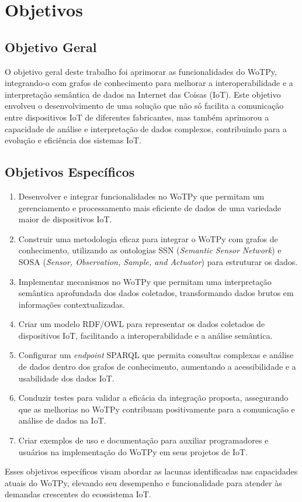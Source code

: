 \chapter{Objetivos}

\section{Objetivo Geral}

O objetivo geral deste trabalho foi aprimorar as funcionalidades do WoTPy, integrando-o com grafos de conhecimento para melhorar a interoperabilidade e a interpretação semântica de dados na Internet das Coisas (IoT). Este objetivo envolveu o desenvolvimento de uma solução que não só facilita a comunicação entre dispositivos IoT de diferentes fabricantes, mas também aprimorou a capacidade de análise e interpretação de dados complexos, contribuindo para a evolução e eficiência dos sistemas IoT.

\section{Objetivos Específicos}

\begin{enumerate}
    \item Desenvolver e integrar funcionalidades no WoTPy que permitam um gerenciamento e processamento mais eficiente de dados de uma variedade maior de dispositivos IoT.
    \item Construir uma metodologia eficaz para integrar o WoTPy com grafos de conhecimento, utilizando as ontologias SSN (\textit{Semantic Sensor Network}) e SOSA (\textit{Sensor, Observation, Sample, and Actuator}) para estruturar os dados.
    \item Implementar mecanismos no WoTPy que permitam uma interpretação semântica aprofundada dos dados coletados, transformando dados brutos em informações contextualizadas.
    \item Criar um modelo RDF/OWL para representar os dados coletados de dispositivos IoT, facilitando a interoperabilidade e a análise semântica.
    \item Configurar um \textit{endpoint} SPARQL que permita consultas complexas e análise de dados dentro dos grafos de conhecimento, aumentando a acessibilidade e a usabilidade dos dados IoT.
    \item Conduzir testes para validar a eficácia da integração proposta, assegurando que as melhorias no WoTPy contribuam positivamente para a comunicação e análise de dados na IoT.
    \item Criar exemplos de uso e documentação para auxiliar programadores e usuários na implementação do WoTPy em seus projetos de IoT.
\end{enumerate}

Esses objetivos específicos visam abordar as lacunas identificadas nas capacidades atuais do WoTPy, elevando seu desempenho e funcionalidade para atender às demandas crescentes do ecossistema IoT.
